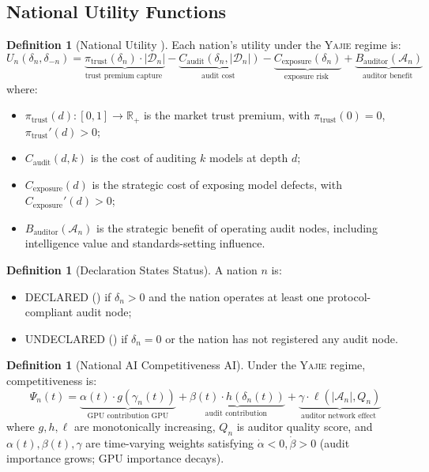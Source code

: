 \documentclass[11pt,a4paper]{article}
\theoremstyle{definition}
\newtheorem{definition}[theorem]{Definition}
\theoremstyle{remark}
\newcommand{\Yajie}{\textsc{Yajie}}
\newcommand{\R}{\mathbb{R}}
\newcommand{\cA}{\mathcal{A}}
\newcommand{\cD}{\mathcal{D}}
\newcommand{\declaredState}{\textsf{DECLARED}}
\newcommand{\undeclaredState}{\textsf{UNDECLARED}}
\newcommand{\trustPremium}{\pi_{\text{trust}}}
\newcommand{\auditDepth}{\delta}
\newcommand{\gpuScale}{\gamma}
\newcommand{\competitiveness}{\Psi}
\begin{document}
\subsection{National Utility Functions}
\begin{definition}[National Utility ]
\label{def:utility}
Each nation's utility under the \Yajie{} regime is:
\begin{equation}
    U_n(\auditDepth_n, \auditDepth_{-n}) = \underbrace{\trustPremium(\auditDepth_n) \cdot |\cD_n|}_{\text{trust premium capture }} - \underbrace{C_{\text{audit}}(\auditDepth_n, |\cD_n|)}_{\text{audit cost }} - \underbrace{C_{\text{exposure}}(\auditDepth_n)}_{\text{exposure risk }} + \underbrace{B_{\text{auditor}}(\cA_n)}_{\text{auditor benefit }}
    \label{eq:utility}
\end{equation}
where:
\begin{itemize}
    \item $\trustPremium(d): [0,1] \to \R_{+}$ is the market trust premium, with $\trustPremium(0) = 0$, $\trustPremium'(d) > 0$;
    \item $C_{\text{audit}}(d, k)$ is the cost of auditing $k$ models at depth $d$;
    \item $C_{\text{exposure}}(d)$ is the strategic cost of exposing model defects, with $C_{\text{exposure}}'(d) > 0$;
    \item $B_{\text{auditor}}(\cA_n)$ is the strategic benefit of operating audit nodes, including intelligence value and standards-setting influence.
\end{itemize}
\end{definition}
\begin{definition}[Declaration States Status]
\label{def:declaration}
A nation $n$ is:
\begin{itemize}
    \item \declaredState{} () if $\auditDepth_n > 0$ and the nation operates at least one protocol-compliant audit node;
    \item \undeclaredState{} () if $\auditDepth_n = 0$ or the nation has not registered any audit node.
\end{itemize}
\end{definition}
\begin{definition}[National AI Competitiveness AI]
\label{def:competitiveness}
Under the \Yajie{} regime, competitiveness is:
\begin{equation}
    \competitiveness_n(t) = \underbrace{\alpha(t) \cdot g(\gpuScale_n(t))}_{\text{GPU contribution GPU}} + \underbrace{\beta(t) \cdot h(\auditDepth_n(t))}_{\text{audit contribution }} + \underbrace{\gamma \cdot \ell(|\cA_n|, Q_n)}_{\text{auditor network effect }}
    \label{eq:competitiveness}
\end{equation}
where $g, h, \ell$ are monotonically increasing, $Q_n$ is auditor quality score, and $\alpha(t), \beta(t), \gamma$ are time-varying weights satisfying $\dot{\alpha} < 0, \dot{\beta} > 0$ (audit importance grows; GPU importance decays).
\end{definition}
\end{document}
